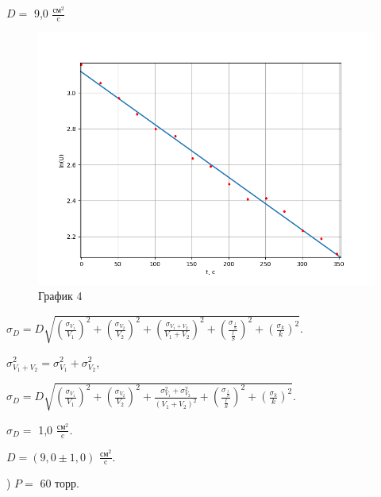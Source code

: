 \documentclass[a4paper,12pt]{article} %
\begin{document}
\begin{enumerate}
$D = $ 9,0 $\frac{\text{см}^2}{\text{c}}$
\newpage
\begin{figure}[h!]
	\centering
	\includegraphics[scale=0.8]{Pictures/График1(лин).png}
	\caption*{График 4}
\end{figure}


$\sigma_{D} = D\sqrt{\left(\frac{\sigma_{V_{1}}}{V_{1}}\right)^2 + \left(\frac{\sigma_{V_{2}}}{V_{2}}\right)^2 + \left(\frac{\sigma_{V_{1} + V_{2}}}{V_{1}+V_{2}}\right)^2 + \left(\frac{\sigma_{\frac{l}{S}}}{\frac{l}{S}}\right)^2 + \left(\frac{\sigma_{k}}{k}\right)^2}$.

$\sigma_{V_{1} + V_{2}}^2 = \sigma_{V_{1}}^2 + \sigma_{V_{2}}^2$,

$\sigma_{D} = D\sqrt{\left(\frac{\sigma_{V_{1}}}{V_{1}}\right)^2 + \left(\frac{\sigma_{V_{2}}}{V_{2}}\right)^2 + \frac{\sigma_{V_{1}}^2 + \sigma_{V_{2}}^2}{(V_{1} + V_{2})^2} + \left(\frac{\sigma_{\frac{l}{S}}}{\frac{l}{S}}\right)^2 + \left(\frac{\sigma_{k}}{k}\right)^2}$.

$\sigma_{D} = $ 1,0 $\frac{\text{см}^2}{\text{c}}$.
\vspace{15mm}

$D = (9,0 \pm 1,0)$ $\frac{\text{см}^2}{\text{c}}$.

) $P = $ 60 торр.


\end{enumerate}
\end{document}
